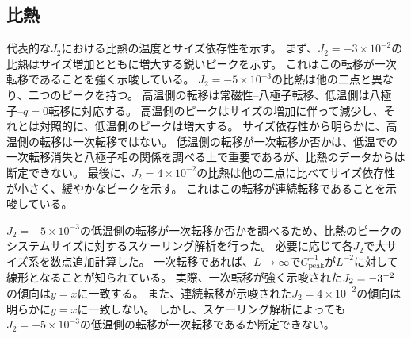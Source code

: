 \documentclass[12pt,titlepage,dvipdfmx]{jarticle}
\begin{document}

\subsection{比熱}
代表的な$J_2$における比熱の温度とサイズ依存性を示す。
まず、$J_2=-3\times10^{-2}$の比熱はサイズ増加とともに増大する鋭いピークを示す。  
これはこの転移が一次転移であることを強く示唆している。
$J_2=-5\times10^{-3}$の比熱は他の二点と異なり、二つのピークを持つ。
高温側の転移は常磁性--八極子転移、低温側は八極子--$q=0$転移に対応する。
高温側のピークはサイズの増加に伴って減少し、それとは対照的に、低温側のピークは増大する。
サイズ依存性から明らかに、高温側の転移は一次転移ではない。
低温側の転移が一次転移か否かは、低温での一次転移消失と八極子相の関係を調べる上で重要であるが、比熱のデータからは断定できない。
最後に、$J_2=4\times10^{-2}$の比熱は他の二点に比べてサイズ依存性が小さく、緩やかなピークを示す。
これはこの転移が連続転移であることを示唆している。

$J_2=-5\times10^{-3}$の低温側の転移が一次転移か否かを調べるため、比熱のピークのシステムサイズに対するスケーリング解析を行った。
必要に応じて各$J_2$で大サイズ系を数点追加計算した。
一次転移であれば、$L\to\infty$で$C_{\mathrm{peak}}^{-1}$が$L^{-2}$に対して線形となることが知られている\cite{baumgartner2012monte}。
実際、一次転移が強く示唆された$J_2=-3\time10^{-2}$の傾向は$y=x$に一致する。
また、連続転移が示唆された$J_2=4\times10^{-2}$の傾向は明らかに$y=x$に一致しない。
しかし、スケーリング解析によっても$J_2=-5\times10^{-3}$の低温側の転移が一次転移であるか断定できない。

%

\end{document}

